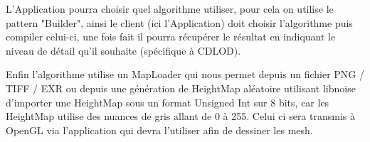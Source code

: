 \documentclass[12pt]{report}
\begin{document}
L’Application pourra choisir quel algorithme utiliser, pour cela on utilise le pattern "Builder", ainsi le client (ici l’Application) doit choisir l’algorithme puis compiler celui-ci, une fois fait il pourra récupérer le résultat en indiquant le niveau de détail qu’il souhaite (spécifique à CDLOD).


Enfin l’algorithme utilise un MapLoader qui nous permet depuis un fichier PNG / TIFF / EXR ou depuis une génération de HeightMap aléatoire utilisant libnoise d’importer une HeightMap sous un format Unsigned Int sur 8 bits, car les HeightMap utilise des nuances de gris allant de 0 à 255. Celui ci sera transmis à OpenGL via l'application qui devra l'utiliser afin de dessiner les mesh.



\end{document}
